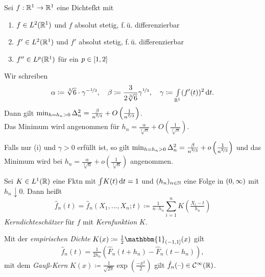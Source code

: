 \documentclass{cheat-sheet}
\newcommand{\ind}{\mathbbm{1}} %
\newcommand{\Cont}{\mathcal{C}} %
\begin{document}
\begin{satz}
  Sei $f : \mathbb{R}^1 \to \mathbb{R}^1$ eine Dichtefkt mit
  \begin{enumerate}[label=(\roman*), itemindent=10pt]
    \item $f \in L^2(\mathbb{R}^1)$ und $f$ absolut stetig, \dh{} f.\,ü. differenzierbar
    \item $f' \in L^2(\mathbb{R}^1)$ und $f'$ absolut stetig, \dh{} f.\,ü. differenzierbar
    \item $f'' \in L^p(\mathbb{R}^1)$ für ein $p \in \left[ 1, 2 \right]$
  \end{enumerate}
  Wir schreiben
  \[
    \alpha \coloneqq \sqrt[3]{6} \cdot \gamma^{- \nicefrac{1}{3}}, \quad
    \beta \coloneqq \frac{3}{2 \sqrt[3]{6}} \gamma^{\nicefrac{1}{3}}, \quad
    \gamma \coloneqq {\textstyle \int\limits_{\mathbb{R}^1}^{}} (f'(t))^2 \,\mathrm{d} t.
  \]
  Dann gilt \enspace
  $\min_{h = h_n > 0} \Delta_n^2 = \tfrac{\beta}{n^{\nicefrac{2}{3}}} + O \left( \tfrac{1}{n^{\nicefrac{2}{3}}} \right)$. \\
  Das Minimum wird angenommen für \enspace
  $h_n = \tfrac{\alpha}{\sqrt[3]{n}} + O \left( \tfrac{1}{\sqrt[3]{n}} \right)$.

  Falls nur (i) und $\gamma > 0$ erfüllt ist, so gilt
  $\min_{h = h_n > 0} \Delta_n^2 = \tfrac{\beta}{n^{\nicefrac{2}{3}}} + o \left( \tfrac{1}{n^{\nicefrac{2}{3}}} \right)$ und das Minimum wird bei $h_n = \tfrac{\alpha}{\sqrt[3]{n}} + o \left( \tfrac{1}{\sqrt[3]{n}} \right)$ angenommen.
\end{satz}

\begin{defn}
  Sei $K \in L^1(\mathbb{R})$ eine Fktn mit ${\textstyle \int} K(t) \,\mathrm{d} t = 1$ und $(h_n)_{n \in \mathbb{N}}$ eine Folge in $\left( 0, \infty \right)$ mit $h_n \downarrow 0$.
  Dann heißt
  \[
    \hat{f}_n(t) = \hat{f}_n(X_1, \ldots, X_n; t) \coloneqq \tfrac{1}{n \cdot h_n} \sum_{i=1}^n K \left( \tfrac{X_i - t}{h_n} \right)
  \]
  \emph{Kerndichteschätzer} für $f$ mit \emph{Kernfunktion} $K$.
\end{defn}


\begin{bspe}
  Mit der \emph{empirischen Dichte} $K(x) \coloneqq \tfrac{1}{2} \ind_{\ocinterval{-1}{1}}(x)$ gilt
  \[ \hat{f}_n(t) = \tfrac{1}{2 h_n} \left( \hat{F}_n(t + h_n) - \hat{F}_n(t - h_n) \right), \]
  mit dem \emph{Gauß-Kern} $K(x) \coloneqq \tfrac{1}{\sqrt{2 \pi}}\exp( \tfrac{- x^2}{2})$ gilt $\hat{f}_n(\blank) \in \Cont^\infty(\R)$.
\end{bspe}
\end{document}
